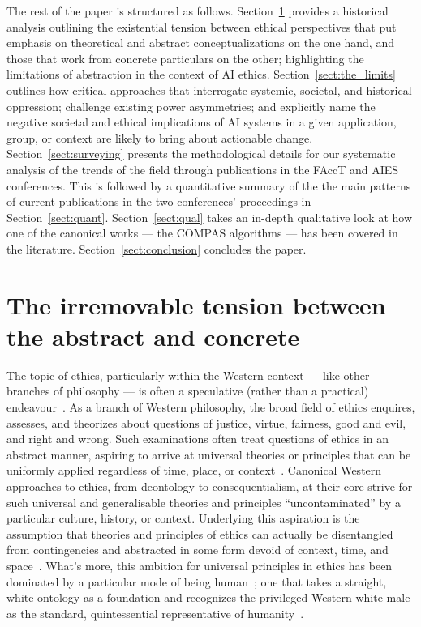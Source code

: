 \documentclass[manuscript]{acmart}
\begin{document}
The rest of the paper is structured as follows. Section~\ref{sect:history_roots} provides a historical analysis outlining the existential tension between ethical perspectives that put emphasis on theoretical and abstract conceptualizations on the one hand, and those that work from concrete particulars on the other; highlighting the limitations of abstraction in the context of AI ethics. Section~\ref{sect:the_limits} outlines how critical approaches that interrogate systemic, societal, and historical oppression; challenge existing power asymmetries; and explicitly name the negative societal and ethical implications of AI systems in a given application, group, or context are likely to bring about actionable change.  Section~\ref{sect:surveying} presents the methodological details for our systematic analysis of the trends of the field through publications in the FAccT and AIES conferences. This is followed by a quantitative summary of the the main patterns of current publications in the two conferences' proceedings in Section~\ref{sect:quant}. Section~\ref{sect:qual} takes an in-depth qualitative look at how one of the canonical works --- the COMPAS algorithms --- has been covered in the literature. Section~\ref{sect:conclusion} concludes the paper. 



\section{The irremovable tension between the abstract and concrete} 
\label{sect:history_roots}

The topic of ethics, particularly within the Western context --- like other branches of philosophy --- is often a speculative (rather than a practical) endeavour~\cite{gardiner1996alterity}. As a branch of Western philosophy, the broad field of ethics enquires, assesses, and theorizes about questions of justice, virtue, fairness, good and evil, and right and wrong. Such examinations often treat questions of ethics in an abstract manner, aspiring to arrive at universal theories or principles that can be uniformly applied regardless of time, place, or context~\cite{markova2016dialogical,de2019loving,shotter2006vygotsky}. Canonical Western approaches to ethics, from deontology to consequentialism, at their core strive for such universal and generalisable theories and principles ``uncontaminated'' by a particular culture, history, or context. Underlying this aspiration is the assumption that theories and principles of ethics can actually be disentangled from contingencies and abstracted in some form devoid of context, time, and space~\cite{juarrero2000dynamics,daston2018calculation}. What’s more, this ambition for universal principles in ethics has been dominated by a particular mode of being human~\cite{Wynter03,ahmed2007phenomenology}; one that takes a straight, white ontology as a foundation and recognizes the privileged Western white male as the standard, quintessential representative of humanity~\cite{ahmed2007phenomenology}. 
\end{document}
